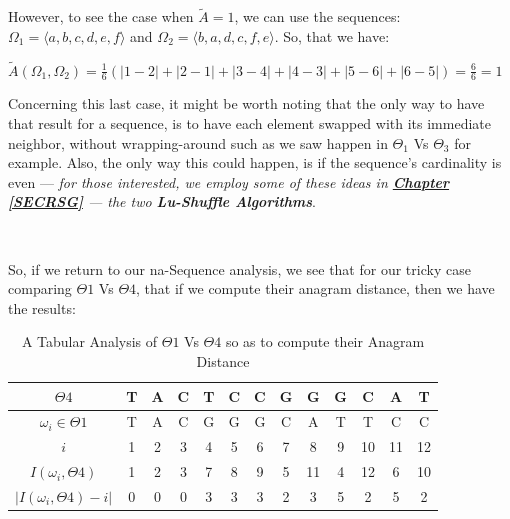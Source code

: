 \documentclass[a4paper, 18pt]{book} %
\begin{document}
\begin{center}
{\begin{minipage}{0.9\textwidth}
\begin{itemize}
{However, to see the case when $\tilde{A} = 1$, we can use the sequences: $\Omega_1 = \langle a, b, c, d, e, f \rangle$ and $\Omega_2 = \langle b, a, d, c, f, e \rangle$. So, that we have:

 $\tilde{A}(\Omega_1,\Omega_2) = \frac{1}{6}(|1-2|+|2-1|+|3-4|+|4-3|+|5-6|+|6-5|) = \frac{6}{6} = 1$
 
 Concerning this last case, it might be worth noting that the only way to have that result for a sequence, is to have each element swapped with its immediate neighbor, without wrapping-around such as we saw happen in $\Theta_1$ Vs $\Theta_3$ for example. Also, the only way this could happen, is if the sequence's cardinality is even --- \textit{for those interested, we employ some of these ideas in \textbf{\hyperref[SECRSG]{Chapter \ref{SECRSG}}} --- the two \textbf{Lu-Shuffle Algorithms}}.

}
\end{itemize}

\end{minipage}}
\\
\end{center}

So, if we return to our na-Sequence analysis, we see that for our tricky case comparing $\Theta1$ Vs $\Theta4$, that if we compute their anagram distance, then we have the results:

\begin{center}

\begin{table}[H]
\centering
\begin{tabular}[t]{|c||c|c|c|c|c|c|c|c|c|c|c|c|}
\hline
$\Theta4$ & T & A & C & T & C & C & G & G & G & C & A & T\\
\hline
$\omega_i \in \Theta1$ & T & A & C & G & G & G & C & A & T & T & C & C\\
\hline
$i$ & 1 & 2 & 3 & 4 & 5 & 6 & 7 & 8 & 9 & 10 & 11 & 12\\
\hline
$I(\omega_i,\Theta4)$ & 1 & 2 & 3 & 7 & 8 & 9 & 5 & 11 & 4 & 12 & 6 & 10\\
\hline
$|I(\omega_i,\Theta4) - i|$ & 0 & 0 & 0 & 3 & 3 & 3 & 2 & 3 & 5 & 2 & 5 & 2\\
\hline
\end{tabular}
\caption{A Tabular Analysis of $\Theta1$ Vs $\Theta4$ so as to compute their Anagram Distance}
\label{TABADM1}
\end{table}

\end{center}
\end{document}
